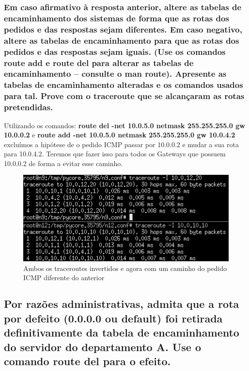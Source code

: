 \documentclass{article}
\begin{document}
\subsubsection{Em caso afirmativo à resposta anterior, altere as tabelas de
encaminhamento dos sistemas de forma que as rotas dos pedidos
e das respostas sejam diferentes. Em caso negativo, altere as
tabelas de encaminhamento para que as rotas dos pedidos e das
respostas sejam iguais. (Use os comandos route add e route del
para alterar as tabelas de encaminhamento – consulte o man
route). Apresente as tabelas de encaminhamento alteradas e os
comandos usados para tal. Prove com o traceroute que se
alcançaram as rotas pretendidas.}

Utilizando os comandos: \textbf{route del -net 10.0.5.0 netmask 255.255.255.0 gw 10.0.0.2} e  \textbf{route add -net 10.0.5.0 netmask 255.255.255.0 gw 10.0.4.2} excluímos a hipótese de o pedido ICMP passar por 10.0.0.2 e mudar a sua rota para 10.0.4.2. Teremos que fazer isso para todos os Gateways que possuem 10.0.0.2 de forma a evitar esse caminho.

\begin{figure}[h]
    \centering
    \includegraphics[width=1\textwidth]{images/routes.png}
    \caption{\label{fig:pacote}Ambos os traceroutes invertidos e agora com um caminho do pedido ICMP diferente do anterior}
\end{figure}

\subsection{Por razões administrativas, admita que a rota por defeito (0.0.0.0 ou default) foi retirada definitivamente da tabela de encaminhamento do servidor do departamento A. Use o comando route del para o efeito.}
\end{document}
